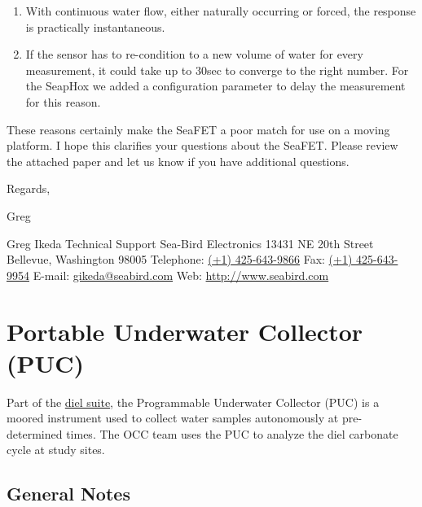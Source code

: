 \documentclass[]{book}
\begin{document}
\begin{enumerate}
\def\labelenumi{\alph{enumi})}
\item
  With continuous water flow, either naturally occurring or forced, the response is practically instantaneous.
\item
  If the sensor has to re-condition to a new volume of water for every measurement, it could take up to 30sec to converge to the right number. For the SeapHox we added a configuration parameter to delay the measurement for this reason.
\end{enumerate}

These reasons certainly make the SeaFET a poor match for use on a moving platform. I hope this clarifies your questions about the SeaFET. Please review the attached paper and let us know if you have additional questions.

Regards,

Greg

Greg Ikeda
Technical Support
Sea-Bird Electronics
13431 NE 20th Street
Bellevue, Washington 98005
Telephone: \href{nulltel:\%28\%2B1\%29\%20425-643-9866}{(+1) 425-643-9866}
Fax: \href{nulltel:\%28\%2B1\%29\%20425-643-9954}{(+1) 425-643-9954}
E-mail: \href{nullmailto:gikeda@seabird.com}{gikeda@seabird.com}
Web: \href{http://www.seabird.com/}{http://www.seabird.com}

\hypertarget{puc}{%
\chapter{Portable Underwater Collector (PUC)}\label{puc}}

Part of the \protect\hyperlink{dielsuite}{diel suite}, the Programmable Underwater Collector (PUC) is a moored instrument used to collect water samples autonomously at pre-determined times. The OCC team uses the PUC to analyze the diel carbonate cycle at study sites.

\hypertarget{general-notes}{%
\section{General Notes}\label{general-notes}}
\end{document}
